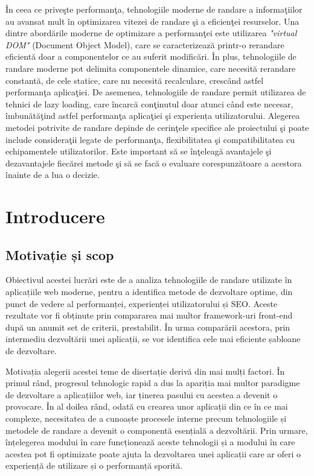 \documentclass[12pt, a4paper]{report}
\begin{document}
\^ In ceea ce prive\c ste performan\c ta, tehnologiile moderne de randare a informa\c tiilor au avansat mult \^ in optimizarea vitezei de randare \c si a eficien\c tei resurselor. Una dintre abord\u arile moderne de optimizare a performan\c tei este utilizarea \emph{"virtual DOM"} (Document Object Model), care se caracterizează printr-o rerandare eficientă doar a componentelor ce au suferit modificări.
\^ In plus, tehnologiile de randare moderne pot delimita componentele dinamice, care necesită rerandare constantă, de cele statice, care nu necesit\u a recalculare, cresc\^ and astfel performan\c ta aplica\c tiei. De asemenea, tehnologiile de randare permit utilizarea de tehnici de lazy loading, care \^ incarc\u a con\c tinutul doar atunci c\^ and este necesar, \^ imbun\u at\u a\c tind astfel performan\c ta aplica\c tiei \c si experiența utilizatorului.
Alegerea metodei potrivite de randare depinde de cerin\c tele specifice ale proiectului \c si poate include considera\c tii legate de performan\c ta, flexibilitatea \c si compatibilitatea cu echipamentele utilizatorilor. Este important s\u a se \^ in\c teleag\u a avantajele \c si dezavantajele fiec\u arei metode \c si s\u a se fac\u a o evaluare corespunz\u atoare a acestora \^ inainte de a lua o decizie.

\chapter{Introducere}

\setcounter{page}{1}


\section{Motivație și scop}

Obiectivul acestei lucrări este de a analiza tehnologiile de randare utilizate în aplicațiile web moderne, pentru a identifica metode de dezvoltare optime, din punct de vedere al performanței, experienței utilizatorului și SEO. Aceste rezultate vor fi obținute prin compararea mai multor framework-uri front-end după un anumit set de criterii, prestabilit. În urma comparării acestora, prin intermediu dezvoltării unei aplicații, se vor identifica cele mai eficiente șabloane de dezvoltare.

Motivația alegerii acestei teme de disertație derivă din mai mulți factori. În primul rând, progresul tehnologic rapid a dus la apariția mai multor paradigme de dezvoltare a aplicațiilor web, iar ținerea pasului cu acestea a devenit o provocare. În al doilea rând, odată cu crearea unor aplicații din ce în ce mai complexe, necesitatea de a cunoaște procesele interne precum tehnologiile și metodele de randare a devenit o componentă esențială a dezvoltării. Prin urmare, înțelegerea modului în care funcționează aceste tehnologii și a modului în care acestea pot fi optimizate poate ajuta la dezvoltarea unei aplicații care ar oferi o experiență de utilizare și o performanță sporită.
\end{document}
